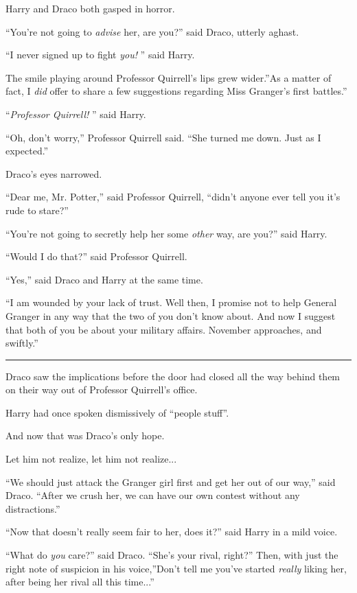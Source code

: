 Harry and Draco both gasped in horror.

``You're not going to \emph{advise} her, are you?'' said Draco, utterly
aghast.

``I never signed up to fight \emph{you!} '' said Harry.

The smile playing around Professor Quirrell's lips grew wider.''As a
matter of fact, I \emph{did} offer to share a few suggestions regarding
Miss Granger's first battles.''

``\emph{Professor Quirrell!} '' said Harry.

``Oh, don't worry,'' Professor Quirrell said. ``She turned me down. Just
as I expected.''

Draco's eyes narrowed.

``Dear me, Mr. Potter,'' said Professor Quirrell, ``didn't anyone ever
tell you it's rude to stare?''

``You're not going to secretly help her some \emph{other} way, are you?''
said Harry.

``Would I do that?'' said Professor Quirrell.

``Yes,'' said Draco and Harry at the same time.

``I am wounded by your lack of trust. Well then, I promise not to help
General Granger in any way that the two of you don't know about. And now
I suggest that both of you be about your military affairs. November
approaches, and swiftly.''

\begin{center}\rule{3in}{0.4pt}\end{center}

Draco saw the implications before the door had closed all the way behind
them on their way out of Professor Quirrell's office.

Harry had once spoken dismissively of ``people stuff''.

And now that was Draco's only hope.

Let him not realize, let him not realize...

``We should just attack the Granger girl first and get her out of our
way,'' said Draco. ``After we crush her, we can have our own contest
without any distractions.''

``Now that doesn't really seem fair to her, does it?'' said Harry in a
mild voice.

``What do \emph{you} care?'' said Draco. ``She's your rival, right?''
Then, with just the right note of suspicion in his voice,''Don't tell me
you've started \emph{really} liking her, after being her rival all this
time...''

